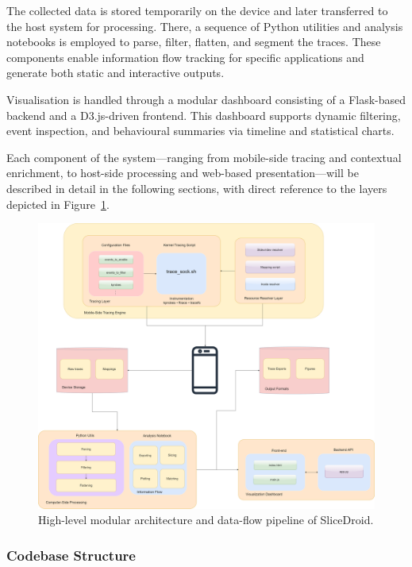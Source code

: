 \documentclass[a4paper,12pt]{report}
\begin{document}
The collected data is stored temporarily on the device and later transferred to the host system for processing. There, a sequence of Python utilities and analysis notebooks is employed to parse, filter, flatten, and segment the traces. These components enable information flow tracking for specific applications and generate both static and interactive outputs.

Visualisation is handled through a modular dashboard consisting of a Flask-based backend and a D3.js-driven frontend. This dashboard supports dynamic filtering, event inspection, and behavioural summaries via timeline and statistical charts.

Each component of the system—ranging from mobile-side tracing and contextual enrichment, to host-side processing and web-based presentation—will be described in detail in the following sections, with direct reference to the layers depicted in Figure~\ref{fig:architecture}.
\begin{figure}[H]
\centering
\includegraphics[width=1\textwidth]{architecture.png}
\caption{High-level modular architecture and data-flow pipeline of SliceDroid.}
\label{fig:architecture}
\end{figure}



\subsubsection{Codebase Structure}
\end{document}
